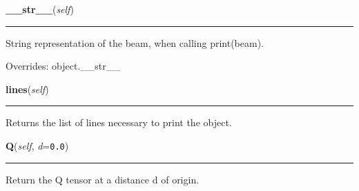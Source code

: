     \vspace{0.5ex}

\hspace{.8\funcindent}\begin{boxedminipage}{\funcwidth}

    \raggedright \textbf{\_\_str\_\_}(\textit{self})

    \vspace{-1.5ex}

    \rule{\textwidth}{0.5\fboxrule}
\setlength{\parskip}{2ex}
    String representation of the beam, when calling print(beam).

\setlength{\parskip}{1ex}
      Overrides: object.\_\_str\_\_

    \end{boxedminipage}

    \label{theia:optics:beam:GaussianBeam:lines}

    \vspace{0.5ex}

\hspace{.8\funcindent}\begin{boxedminipage}{\funcwidth}

    \raggedright \textbf{lines}(\textit{self})

    \vspace{-1.5ex}

    \rule{\textwidth}{0.5\fboxrule}
\setlength{\parskip}{2ex}
    Returns the list of lines necessary to print the object.

\setlength{\parskip}{1ex}
    \end{boxedminipage}

    \label{theia:optics:beam:GaussianBeam:Q}

    \vspace{0.5ex}

\hspace{.8\funcindent}\begin{boxedminipage}{\funcwidth}

    \raggedright \textbf{Q}(\textit{self}, \textit{d}={\tt 0.0})

    \vspace{-1.5ex}

    \rule{\textwidth}{0.5\fboxrule}
\setlength{\parskip}{2ex}
    Return the Q tensor at a distance d of origin.

\setlength{\parskip}{1ex}
    \end{boxedminipage}

